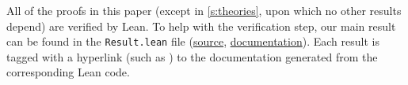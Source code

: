 All of the proofs in this paper (except in \cref{s:theories}, upon which no other results depend) are verified by Lean.
To help with the verification step, our main result can be found in the \texttt{Result.lean} file (\href{https://github.com/leanprover-community/con-nf/blob/main/ConNF/Model/Result.lean}{source}, \href{https://leanprover-community.github.io/con-nf/doc/ConNF/Model/Result.html}{documentation}).
Each result is tagged with a hyperlink (such as ) to the documentation generated from the corresponding Lean code.
